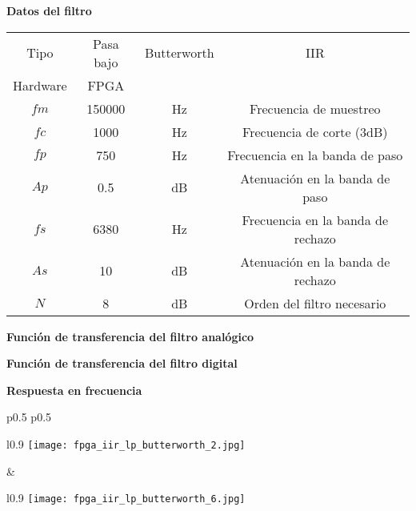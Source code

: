 \documentclass[informe.tex]{subfiles}
\begin{document}
\textbf{Datos del filtro}	\newline	
								
	\begin{tabular}{ |c | c| c| c|}
		\hline
 			 Tipo     & Pasa bajo & Butterworth &  IIR \\
 			 Hardware & FPGA &  & \\
			$ fm $  & 150000  & Hz & Frecuencia de muestreo \\
			$ fc $  & 1000  & Hz & Frecuencia de corte (3dB) \\
			$ fp $  & 750  & Hz & Frecuencia en la banda de paso\\
			$ Ap $  & 0.5  & dB & Atenuación en la banda de paso \\			
			$ fs $  & 6380  & Hz & Frecuencia en la banda de rechazo \\
			$ As $  & 10  & dB & Atenuación en la banda de rechazo \\
			$ N $  & 8  & dB & Orden del filtro necesario \\			
		\hline
	\end{tabular}\newline\newline		
	
\textbf{Función de transferencia del filtro analógico}\newline
	\begin{tiny}
		
	\end{tiny}\newline
    	
\textbf{Función de transferencia del filtro digital}\newline
	\begin{tiny}
		
	\end{tiny}\newline
	
\textbf{Respuesta en frecuencia}\newline
	\begin{tabular}{p{0.5\textwidth} p{0.5\textwidth}}		
		\begin{wrapfigure}{l}{0.9\linewidth}
    		\centering
    		\texttt{[image: fpga\_iir\_lp\_butterworth\_2.jpg]}
    		\caption{Filtro analógico}
		\end{wrapfigure}					
		&	
	 	\begin{wrapfigure}{l}{0.9\linewidth}
    		\centering
    		\texttt{[image: fpga\_iir\_lp\_butterworth\_6.jpg]}
    		\caption{Filtro digital}
		\end{wrapfigure}			
	 	\\ 
	\end{tabular}\newpage
	
\end{document}
